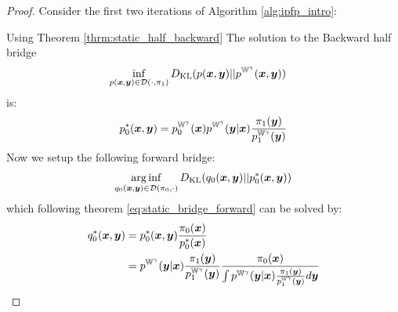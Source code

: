 \documentclass[a4paper,12pt,twoside,openright]{report}
\theoremstyle{definition}
\begin{document}
\begin{proof}
Consider the first two iterations of Algorithm \ref{alg:ipfp_intro}:

Using Theorem \ref{thrm:static_half_backward}  The solution to the Backward half bridge
 \begin{align}
        \inf_{p({\bm{x}},{\bm{y}}) \in {\mathcal{D}}( \cdot, \pi_1)} D_{\mathrm{KL}}  &(p({\bm{x}},{\bm{y}}) || p^{\mathbb{W}^{\gamma}}({\bm{x}},{\bm{y}})) \nonumber 
\end{align}
is:
\begin{align}
    p_0^{*} ({\bm{x}}, {\bm{y}}) = p^{\mathbb{W}^{\gamma}}_0({\bm{x}}) p^{\mathbb{W}^{\gamma}}({\bm{y}}| {\bm{x}}) \frac{\pi_1({\bm{y}})}{p^{\mathbb{W}^{\gamma}}_1({\bm{y}})}
\end{align}
Now we setup the following forward bridge:
\begin{align}
    \operatorname*{arg\,inf}_{q_0({\bm{x}}, {\bm{y}})  \in {\mathcal{D}}(\pi_0 , \cdot)}D_{\mathrm{KL}} (q_0({\bm{x}}, {\bm{y}}) ||p_0^{*} ({\bm{x}}, {\bm{y}}))
\end{align}
which following theorem \ref{eq:static_bridge_forward} can be solved by:
\begingroup
\allowdisplaybreaks
\begin{align}
    q_0^{*} ({\bm{x}}, {\bm{y}}) &= p_0^{*} ({\bm{x}}, {\bm{y}}) \frac{\pi_0({\bm{x}})}{p_0^{*} ({\bm{x}})} \\
 &=  p^{\mathbb{W}^{\gamma}}({\bm{y}}| {\bm{x}}) \frac{\pi_1({\bm{y}})}{p^{\mathbb{W}^{\gamma}}_1({\bm{y}})} \frac{\pi_0({\bm{x}})}{\int   p^{\mathbb{W}^{\gamma}}({\bm{y}}| {\bm{x}}) \frac{\pi_1({\bm{y}})}{p^{\mathbb{W}^{\gamma}}_1({\bm{y}})} d{\bm{y}}}
\end{align}
\endgroup


\end{proof}
\end{document}
